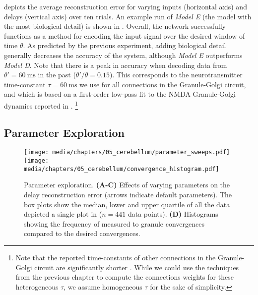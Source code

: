  depicts the average reconstruction error for varying inputs (horizontal axis) and delays (vertical axis) over ten trials.
An example run of \emph{Model E} (the model with the most biological detail) is shown in .
Overall, the network successfully functions as a method for encoding the input signal over the desired window of time $\theta$.
As predicted by the previous experiment, adding biological detail generally decreases the accuracy of the system, although \emph{Model E} outperforms \emph{Model D}.
Note that there is a peak in accuracy when decoding data from $\theta' = \SI{60}{\milli\second}$ in the past ($\theta'/\theta=0.15$).
This corresponds to the neurotransmitter time-constant $\tau = \SI{60}{\milli\second}$ we use for all connections in the Granule-Golgi circuit, and which is based on a first-order low-pass fit to the NMDA Granule-Golgi dynamics reported in \citet{dieudonne1998submillisecond}.%
\footnote{Note that the reported time-constants of other connections in the Granule-Golgi circuit are significantly shorter \citep{kanichay2008synaptic}.
While we could use the techniques from the previous chapter to compute the connections weights for these heterogeneous $\tau$, we assume homogeneous $\tau$ for the sake of simplicity.}

\clearpage

\subsection{Parameter Exploration}
\label{sec:cerebellum_vary_parameters}

\begin{figure}[t]%
	\centering
	\texttt{[image: media/chapters/05\_cerebellum/parameter\_sweeps.pdf]}%
	\texttt{[image: media/chapters/05\_cerebellum/convergence\_histogram.pdf]}%
	{\label{fig:cerebellum_param_sweeps_a}}%
	{\label{fig:cerebellum_param_sweeps_b}}%
	{\label{fig:cerebellum_param_sweeps_c}}%
	{\label{fig:cerebellum_param_sweeps_d}}%
	\caption[Cerebellum model parameter exploration.]{Parameter exploration. \textbf{(A-C)} Effects of varying parameters on the delay reconstruction error (arrows indicate default parameters). The box plots show the median, lower and upper quartile of all the data depicted a single plot in  ($n = 441$ data points). \textbf{(D)} Histograms showing the frequency of measured \PCN to granule convergences compared to the desired convergences.}
	\label{fig:cerebellum_param_sweeps}
\end{figure}


